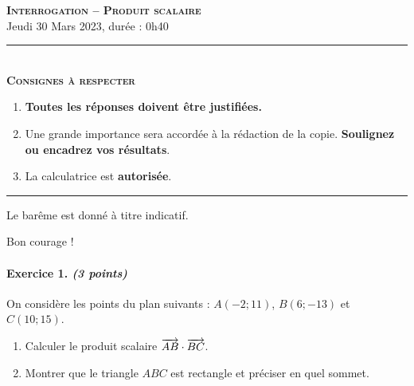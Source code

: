 \documentclass[11pt]{article}
\begin{document}

\begin{center}
\textbf{\LARGE \textsc{Interrogation -- Produit scalaire}}\\[2mm]

{\large Jeudi 30 Mars 2023, durée : 0h40}\\[1mm]
\noindent\rule{8cm}{0.4pt}\\[1mm]
\textbf{\textsc{Consignes à respecter}}
\begin{enumerate}[label=\textbf{\arabic*/}]
\item \textbf{Toutes les réponses doivent être justifiées.}
\item Une grande importance sera accordée à la rédaction de la
  copie. \textbf{Soulignez ou encadrez vos résultats}.
\item La calculatrice est \textbf{autorisée}.
    \end{enumerate}
\noindent\rule{12cm}{0.4pt}
\end{center}

\vspace{2mm}
\noindent Le barême est donné à titre indicatif.
\vspace{2mm}
\begin{center}
  Bon courage !
\end{center}

\paragraph{Exercice 1. \emph{(3 points)}}
On considère les points du plan suivants : $A(-2; 11)$, $B(6; -13)$ et
$C(10; 15)$.
\begin{enumerate}
  \item Calculer le produit scalaire $\overrightarrow{AB}\cdot\overrightarrow{BC}$.
  \item Montrer que le triangle $ABC$ est rectangle et préciser en quel sommet.
\end{enumerate}
\end{document}
